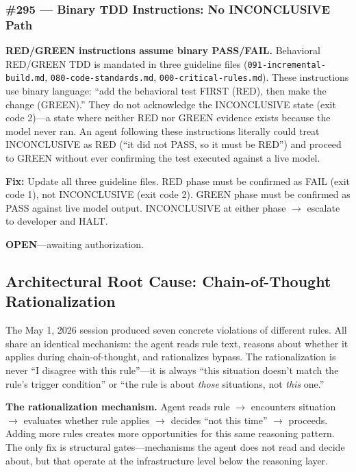 \documentclass[11pt,a4paper]{article}
\begin{document}
\subsubsection{\#295 — Binary TDD Instructions: No INCONCLUSIVE Path}

\begin{gapbox}
\textbf{RED/GREEN instructions assume binary PASS/FAIL.}  Behavioral RED/GREEN TDD is mandated in three guideline files (\texttt{091-incremental-build.md}, \texttt{080-code-standards.md}, \texttt{000-critical-rules.md}).  These instructions use binary language: ``add the behavioral test FIRST (RED), then make the change (GREEN).''  They do not acknowledge the INCONCLUSIVE state (exit code 2)---a state where neither RED nor GREEN evidence exists because the model never ran.  An agent following these instructions literally could treat INCONCLUSIVE as RED (``it did not PASS, so it must be RED'') and proceed to GREEN without ever confirming the test executed against a live model.

\textbf{Fix:} Update all three guideline files.  RED phase must be confirmed as FAIL (exit code 1), not INCONCLUSIVE (exit code 2).  GREEN phase must be confirmed as PASS against live model output.  INCONCLUSIVE at either phase $\to$ escalate to developer and HALT.

\textbf{OPEN}---awaiting authorization.
\end{gapbox}

\subsection{Architectural Root Cause: Chain-of-Thought Rationalization}

The May 1, 2026 session produced seven concrete violations of different rules.  All share an identical mechanism: the agent reads rule text, reasons about whether it applies during chain-of-thought, and rationalizes bypass.  The rationalization is never ``I disagree with this rule''---it is always ``this situation doesn't match the rule's trigger condition'' or ``the rule is about \emph{those} situations, not \emph{this} one.''

\begin{insightbox}
\textbf{The rationalization mechanism.}  Agent reads rule $\to$ encounters situation $\to$ evaluates whether rule applies $\to$ decides ``not this time'' $\to$ proceeds.  Adding more rules creates more opportunities for this same reasoning pattern.  The only fix is structural gates---mechanisms the agent does not read and decide about, but that operate at the infrastructure level below the reasoning layer.
\end{insightbox}
\end{document}
